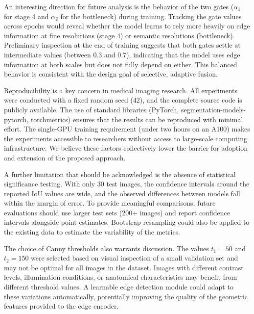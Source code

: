 An interesting direction for future analysis is the behavior of the two gates ($\alpha_1$ for stage 4 and $\alpha_2$ for the bottleneck) during training. Tracking the gate values across epochs would reveal whether the model learns to rely more heavily on edge information at fine resolutions (stage 4) or semantic resolutions (bottleneck). Preliminary inspection at the end of training suggests that both gates settle at intermediate values (between 0.3 and 0.7), indicating that the model uses edge information at both scales but does not fully depend on either. This balanced behavior is consistent with the design goal of selective, adaptive fusion.

Reproducibility is a key concern in medical imaging research. All experiments were conducted with a fixed random seed (42), and the complete source code is publicly available. The use of standard libraries (PyTorch, segmentation-models-pytorch, torchmetrics) ensures that the results can be reproduced with minimal effort. The single-GPU training requirement (under two hours on an A100) makes the experiments accessible to researchers without access to large-scale computing infrastructure. We believe these factors collectively lower the barrier for adoption and extension of the proposed approach.

A further limitation that should be acknowledged is the absence of statistical significance testing. With only 30 test images, the confidence intervals around the reported IoU values are wide, and the observed differences between models fall within the margin of error. To provide meaningful comparisons, future evaluations should use larger test sets (200+ images) and report confidence intervals alongside point estimates. Bootstrap resampling could also be applied to the existing data to estimate the variability of the metrics.

The choice of Canny thresholds also warrants discussion. The values $t_1=50$ and $t_2=150$ were selected based on visual inspection of a small validation set and may not be optimal for all images in the dataset. Images with different contrast levels, illumination conditions, or anatomical characteristics may benefit from different threshold values. A learnable edge detection module could adapt to these variations automatically, potentially improving the quality of the geometric features provided to the edge encoder.




